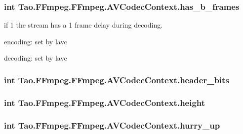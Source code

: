 \label{struct_tao_1_1_f_fmpeg_1_1_f_fmpeg_1_1_a_v_codec_context_a8763961562428a870c1c8d8ad4111777}
\hypertarget{struct_tao_1_1_f_fmpeg_1_1_f_fmpeg_1_1_a_v_codec_context_a86d13d659f35c24e8a1f8629fa726223}{
\subsubsection[{has\_\-b\_\-frames}]{\setlength{\rightskip}{0pt plus 5cm}int {\bf Tao.FFmpeg.FFmpeg.AVCodecContext.has\_\-b\_\-frames}}}
\label{struct_tao_1_1_f_fmpeg_1_1_f_fmpeg_1_1_a_v_codec_context_a86d13d659f35c24e8a1f8629fa726223}
if 1 the stream has a 1 frame delay during decoding.
\begin{DoxyItemize}
\item encoding: set by lavc
\item decoding: set by lavc 
\end{DoxyItemize}\hypertarget{struct_tao_1_1_f_fmpeg_1_1_f_fmpeg_1_1_a_v_codec_context_a140c1594e869aea811bb4292a3b07221}{
\subsubsection[{header\_\-bits}]{\setlength{\rightskip}{0pt plus 5cm}int {\bf Tao.FFmpeg.FFmpeg.AVCodecContext.header\_\-bits}}}
\label{struct_tao_1_1_f_fmpeg_1_1_f_fmpeg_1_1_a_v_codec_context_a140c1594e869aea811bb4292a3b07221}
\hypertarget{struct_tao_1_1_f_fmpeg_1_1_f_fmpeg_1_1_a_v_codec_context_a597410af2a22385c0390e46a85b0a9b4}{
\subsubsection[{height}]{\setlength{\rightskip}{0pt plus 5cm}int {\bf Tao.FFmpeg.FFmpeg.AVCodecContext.height}}}
\label{struct_tao_1_1_f_fmpeg_1_1_f_fmpeg_1_1_a_v_codec_context_a597410af2a22385c0390e46a85b0a9b4}
\hypertarget{struct_tao_1_1_f_fmpeg_1_1_f_fmpeg_1_1_a_v_codec_context_af6e3e022f95145f5e5ef763b1390dd5b}{
\subsubsection[{hurry\_\-up}]{\setlength{\rightskip}{0pt plus 5cm}int {\bf Tao.FFmpeg.FFmpeg.AVCodecContext.hurry\_\-up}}}
